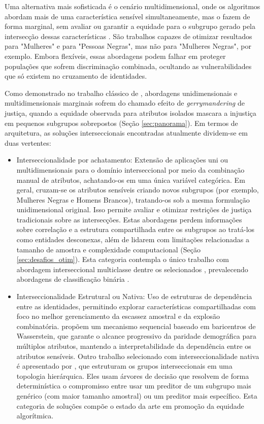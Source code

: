 Uma alternativa mais sofisticada é o cenário multidimensional, onde os algoritmos abordam mais de uma característica sensível simultaneamente, mas o fazem de forma marginal, sem avaliar ou garantir a equidade para o subgrupo gerado pela intersecção dessas características \cite{geden2021fair,buyl2022optimal}. São trabalhos capazes de otimizar resultados para "Mulheres" e para "Pessoas Negras", mas não para "Mulheres Negras", por exemplo. Embora flexíveis, essas abordagens podem falhar em proteger populações que sofrem discriminação combinada, ocultando as vulnerabilidades que só existem no cruzamento de identidades.

Como demonstrado no trabalho clássico de \citet{kearns2018preventing}, abordagens unidimensionais e multidimensionais marginais sofrem do chamado efeito de \textit{gerrymandering} de justiça, quando a equidade observada para atributos isolados mascara a injustiça em pequenos subgrupos sobrepostos (Seção \ref{sec:panorama}). Em termos de arquitetura, as soluções interseccionais encontradas atualmente dividem-se em duas vertentes:
\begin{itemize}
    \item Interseccionalidade por achatamento: Extensão de aplicações uni ou multidimensionais para o domínio interseccional por meio da combinação manual de atributos, achatando-os em uma única variável categórica. Em geral, cruzam-se os atributos sensíveis criando novos subgrupos (por exemplo, Mulheres Negras e Homens Brancos), tratando-os sob a mesma formulação unidimensional original. Isso permite avaliar e otimizar restrições de justiça tradicionais sobre as intersecções. Estas abordagens perdem informações sobre correlação e a estrutura compartilhada entre os subgrupos ao tratá-los como entidades desconexas, além de lidarem com limitações relacionadas a tamanho de amostra e complexidade computacional (Seção \ref{sec:desafios_otim}). Esta categoria contempla o único trabalho com abordagem interseccional multiclasse dentre os selecionados \cite{martinez2020minimax}, prevalecendo abordagens de classificação binária \cite{wang2021fair,wang2022towards,gardner2023cross,lahoti2020fairness}.
    \item  Interseccionalidade Estrutural ou Nativa: Uso de estruturas de dependência entre as identidades, permitindo explorar características compartilhadas com foco no melhor gerenciamento da escassez amostral e da explosão combinatória. \citet{hu2024sequentially} propõem um mecanismo sequencial baseado em baricentros de Wasserstein, que garante o alcance progressivo da paridade demográfica para múltiplos atributos, mantendo a interpretabilidade da dependência entre os atributos sensíveis. Outro trabalho selecionado com interseccionalidade nativa é apresentado por \citet{deng2024multi}, que estruturam os grupos interseccionais em uma topologia hierárquica. Eles usam árvores de decisão que resolvem de forma determinística o compromisso entre usar um preditor de um subgrupo mais genérico (com maior tamanho amostral) ou um preditor mais específico. Esta categoria de soluções compõe o estado da arte em promoção da equidade algorítmica.
\end{itemize}

